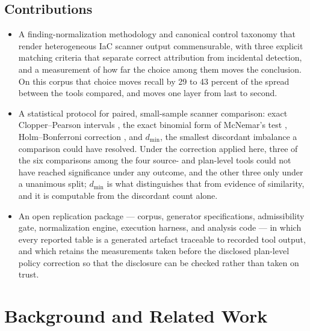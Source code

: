 \documentclass[smallextended]{svjour3}
\begin{document}
\subsection{Contributions}
\begin{itemize}
\item A finding-normalization methodology and canonical control taxonomy that
render heterogeneous IaC scanner output commensurable, with three explicit
matching criteria that separate correct attribution from incidental detection,
and a measurement of how far the choice among them moves the conclusion. On this
corpus that choice moves recall by 29 to 43 percent of the spread between the
tools compared, and moves one layer from last to second.
\item A statistical protocol for paired, small-sample scanner comparison: exact
Clopper--Pearson intervals \citep{clopper1934use}, the exact binomial form of
McNemar's test \citep{mcnemar1947note, dietterich1998approximate},
Holm--Bonferroni correction \citep{holm1979simple}, and $d_{\min}$, the smallest
discordant imbalance a comparison could have resolved. Under the correction
applied here, three of the six comparisons among the four source- and plan-level
tools could not have reached significance under any outcome, and the other three
only under a unanimous split; $d_{\min}$ is what distinguishes that from evidence
of similarity, and it is computable from the discordant count
alone.
\item An open replication package --- corpus, generator specifications,
admissibility gate, normalization engine, execution harness, and analysis code
--- in which every reported table is a generated artefact traceable to recorded
tool output, and which retains the measurements taken before the disclosed
plan-level policy correction so that the disclosure can be checked rather than taken on trust.
\end{itemize}

\section{Background and Related Work}
\label{sec:related}
\end{document}

